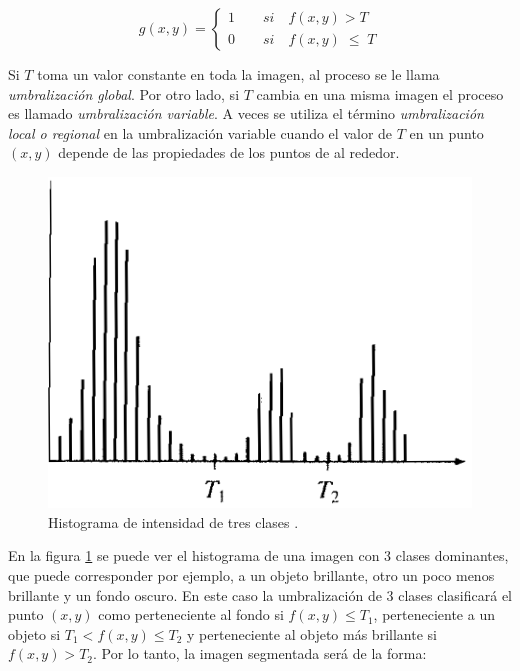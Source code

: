 \begin{equation}
g(x,y) = \left\{
\begin{array}{l}
\displaystyle 1{\qquad}si{\quad}f(x,y) > T\\
\displaystyle 0{\qquad}si{\quad}f(x,y)\;{\leq}\;T
\end{array} 
\right.
\label{eq:xdef}
\end{equation}

Si $T$ toma un valor constante en toda la imagen, al proceso se le llama \textit{umbralización global}. Por otro lado, si $T$ cambia en una misma imagen el proceso es llamado \textit{umbralización variable}. A veces se utiliza el término \textit{umbralización local o regional} en la umbralización variable cuando el valor de $T$ en un punto $(x,y)$ depende de las propiedades de los puntos de al rededor.

\begin{figure}[hbt]
\begin{center}
\includegraphics[scale=0.35]{img/hist3clases.png}
\end{center}
\vspace{-0.5cm}
\caption{Histograma de intensidad de tres clases \cite{segment}.}
\label{hist3class}
\end{figure}

En la figura \ref{hist3class} se puede ver el histograma de una imagen con 3 clases dominantes, que puede corresponder por ejemplo, a un objeto brillante, otro un poco menos brillante y un fondo oscuro. En este caso la umbralización de 3 clases clasificará el punto $(x,y)$ como perteneciente al fondo si $f(x,y) {\leq} T_1$, perteneciente a un objeto si $T_1 < f(x,y) {\leq} T_2$ y perteneciente al objeto más brillante si $f(x,y) > T_2$. Por lo tanto, la imagen segmentada será de la forma:

